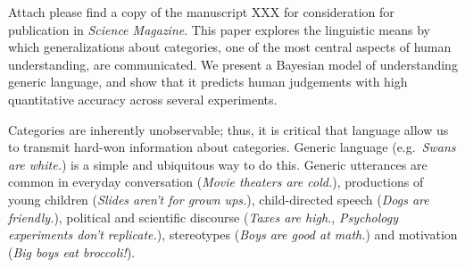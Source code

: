 \documentclass[11pt,stdletter,dateno,sigleft]{newlfm} %
\begin{document}
\begin{newlfm}


%
%
%

Attach please find a copy of the manuscript XXX %
 for consideration for publication in \emph{Science Magazine}. 
This paper explores the linguistic means by which generalizations about categories, one of the most central aspects of human understanding, are communicated.  
We present a Bayesian model of understanding generic language, and show that it predicts human judgements with high quantitative accuracy across several experiments.


Categories are inherently unobservable; thus, it is critical that language allow us to transmit hard-won information about categories. Generic language (e.g.~\emph{Swans are white.}) is a simple and ubiquitous way to do this. 
Generic utterances are common in everyday conversation (\emph{Movie theaters are cold.}), productions of young children (\emph{Slides aren't for grown ups.}), child-directed speech (\emph{Dogs are friendly.}), political and scientific discourse (\emph{Taxes are high.}, \emph{Psychology experiments don't replicate.}), stereotypes (\emph{Boys are good at math.}) and motivation (\emph{Big boys eat broccoli!}).


\end{newlfm}
\end{document}
